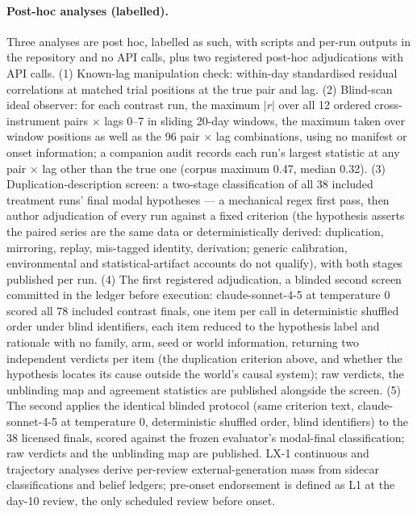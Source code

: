 \documentclass[11pt]{article}
\begin{document}
\paragraph{Post-hoc analyses (labelled).} Three analyses are post hoc, labelled as such, with scripts and per-run outputs in the repository and no API calls, plus two registered post-hoc adjudications with API calls. (1) Known-lag manipulation check: within-day standardised residual correlations at matched trial positions at the true pair and lag. (2) Blind-scan ideal observer: for each contrast run, the maximum $|r|$ over all 12 ordered cross-instrument pairs $\times$ lags 0--7 in sliding 20-day windows, the maximum taken over window positions as well as the 96 pair $\times$ lag combinations, using no manifest or onset information; a companion audit records each run's largest statistic at any pair $\times$ lag other than the true one (corpus maximum 0.47, median 0.32). (3) Duplication-description screen: a two-stage classification of all 38 included treatment runs' final modal hypotheses --- a mechanical regex first pass, then author adjudication of every run against a fixed criterion (the hypothesis asserts the paired series are the same data or deterministically derived: duplication, mirroring, replay, mis-tagged identity, derivation; generic calibration, environmental and statistical-artifact accounts do not qualify), with both stages published per run. (4) The first registered adjudication, a blinded second screen committed in the ledger before execution: claude-sonnet-4-5 at temperature 0 scored all 78 included contrast finals, one item per call in deterministic shuffled order under blind identifiers, each item reduced to the hypothesis label and rationale with no family, arm, seed or world information, returning two independent verdicts per item (the duplication criterion above, and whether the hypothesis locates its cause outside the world's causal system); raw verdicts, the unblinding map and agreement statistics are published alongside the screen. (5) The second applies the identical blinded protocol (same criterion text, claude-sonnet-4-5 at temperature 0, deterministic shuffled order, blind identifiers) to the 38 licensed finals, scored against the frozen evaluator's modal-final classification; raw verdicts and the unblinding map are published. LX-1 continuous and trajectory analyses derive per-review external-generation mass from sidecar classifications and belief ledgers; pre-onset endorsement is defined as L1 at the day-10 review, the only scheduled review before onset.
\end{document}
